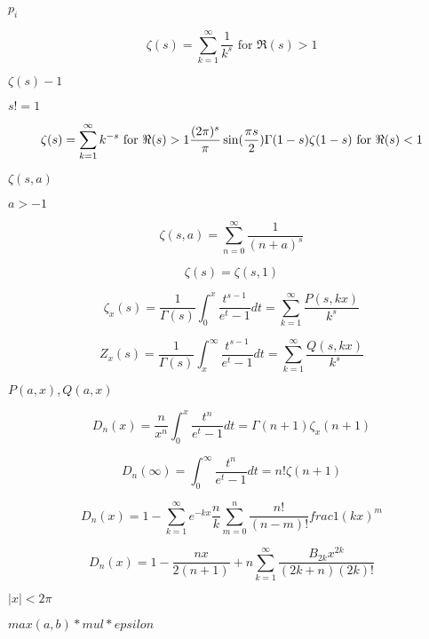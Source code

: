 \documentclass{article}
\begin{document}
$ {p_i} $
\pagebreak

\[ \zeta(s) = \sum_{k=1}^{\infty} \frac{1}{k^{s}} \mbox{ for } \Re(s) > 1 \]
\pagebreak

$ \zeta(s) - 1 $
\pagebreak

$ s != 1 $
\pagebreak

\[ \zeta(s) = \sum_{k=1}^{\infty} k^{-s} \mbox{ for } \Re(s) > 1 \\ \frac{(2\pi)^s}{\pi} \sin(\frac{\pi s}{2}) \Gamma(1 - s) \zeta(1 - s) \mbox{ for } \Re(s) < 1 \]
\pagebreak

$ \zeta(s,a) $
\pagebreak

$ a > -1 $
\pagebreak

\[ \zeta(s,a) = \sum_{n=0}^{\infty} \frac{1}{(n+a)^s} \]
\pagebreak

\[ \zeta(s) = \zeta(s,1) \]
\pagebreak

\[ \zeta_x(s) = \frac{1}{\Gamma(s)}\int_{0}^{x}\frac{t^{s-1}}{e^t-1}dt = \sum_{k=1}^{\infty}\frac{P(s,kx)}{k^s} \]
\pagebreak

\[ Z_x(s) = \frac{1}{\Gamma(s)}\int_{x}^{\infty}\frac{t^{s-1}}{e^t-1}dt = \sum_{k=1}^{\infty}\frac{Q(s,kx)}{k^s} \]
\pagebreak

$ P(a,x), Q(a,x) $
\pagebreak

\[ D_n(x) = \frac{n}{x^n}\int_{0}^{x}\frac{t^n}{e^t-1}dt = \Gamma(n+1)\zeta_x(n+1) \]
\pagebreak

\[ D_n(\infty) = \int_{0}^{\infty}\frac{t^n}{e^t-1}dt = n!\zeta(n+1) \]
\pagebreak

\[ D_n(x) = 1 - \sum_{k = 1}^{\infty} e^{-kx} \frac{n}{k}\sum_{m=0}^{n}\frac{n!}{(n-m)!}frac{1}{(kx)^m} \]
\pagebreak

\[ D_n(x) = 1 - \frac{n x}{2(n+1)} + n \sum_{k = 1}^{\infty} \frac{B_{2k} x^{2k}}{(2k + n)(2k)!} \]
\pagebreak

$ |x| < 2\pi $
\pagebreak

$ max(a,b) * mul * epsilon $
\pagebreak
\end{document}
